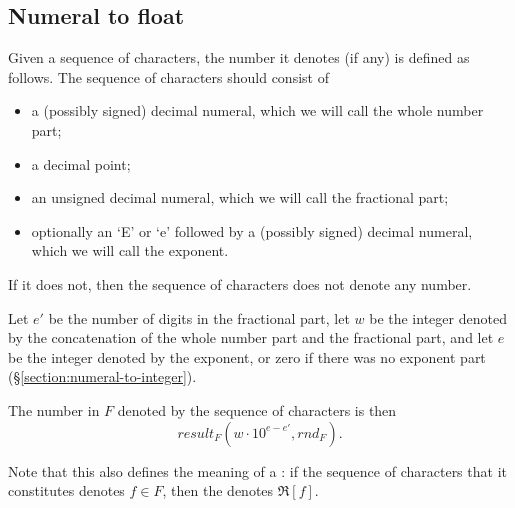 \subsection{Numeral to float}

\label{section:numeral-to-float}
Given a sequence of characters, the number it denotes (if any) is defined as follows.
The sequence of characters should consist of
\begin{itemize}
\item a (possibly signed) decimal numeral, which we will call the whole number part;
\item a decimal point;
\item an unsigned decimal numeral, which we will call the fractional part;
\item optionally an `E' or `e' followed by a (possibly signed) decimal numeral,
which we will call the exponent.
\end{itemize}
If it does not, then the sequence of characters does not denote any number.

Let $e'$ be the number of digits in the fractional part,
let $w$ be the integer denoted by the concatenation of the whole number part and
the fractional part, and let $e$ be the integer denoted by the exponent, or
zero if there was no exponent part
(\S\ref{section:numeral-to-integer}).

The number in $F$ denoted by the sequence of characters is then
\[\mathit{result}_F(w\cdot10^{e-e'},\mathit{rnd}_F).\]

Note that this also defines the meaning of a
: if the sequence of characters
that it constitutes denotes $f\in F$, then the  denotes $\Re[f]$.
